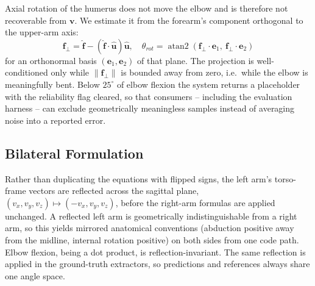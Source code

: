 \documentclass[conference]{IEEEtran}
\begin{document}
Axial rotation of the humerus does not move the elbow and is therefore
not recoverable from $\mathbf{v}$. We estimate it from the forearm's
component orthogonal to the upper-arm axis:
\begin{equation}
\mathbf{f}_\perp = \hat{\mathbf{f}} - (\hat{\mathbf{f}}\cdot\hat{\mathbf{u}})\hat{\mathbf{u}}, \quad
\theta_{rot} = \operatorname{atan2}(\mathbf{f}_\perp\!\cdot\!\mathbf{e}_1,\ \mathbf{f}_\perp\!\cdot\!\mathbf{e}_2)
\end{equation}
for an orthonormal basis $(\mathbf{e}_1, \mathbf{e}_2)$ of that plane.
The projection is well-conditioned only while $\|\mathbf{f}_\perp\|$ is
bounded away from zero, i.e.\ while the elbow is meaningfully bent. Below
$25^\circ$ of elbow flexion the system returns a placeholder with the
reliability flag cleared, so that consumers -- including the evaluation
harness -- can exclude geometrically meaningless samples instead of
averaging noise into a reported error.

\subsection{Bilateral Formulation}
\label{sec:bilateral}
Rather than duplicating the equations with flipped signs, the left arm's
torso-frame vectors are reflected across the sagittal plane,
$(v_x,v_y,v_z)\mapsto(-v_x,v_y,v_z)$, before the right-arm formulas are
applied unchanged. A reflected left arm is geometrically
indistinguishable from a right arm, so this yields mirrored anatomical
conventions (abduction positive away from the midline, internal rotation
positive) on both sides from one code path. Elbow flexion, being a dot
product, is reflection-invariant. The same reflection is applied in the
ground-truth extractors, so predictions and references always share one
angle space.
\end{document}
